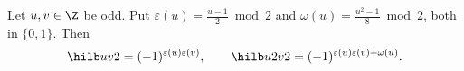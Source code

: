 Let $u,v\in\Z$ be odd. Put $\varepsilon(u)=\frac{u-1}2\bmod 2$ and $\omega(u)=\frac{u^2-1}8\bmod 2$, both in $\{0,1\}$. Then
\[
  \hilb uv2=(-1)^{\varepsilon(u)\varepsilon(v)},\qquad \hilb u{2v}2=(-1)^{\varepsilon(u)\varepsilon(v)+\omega(u)}.
\]
